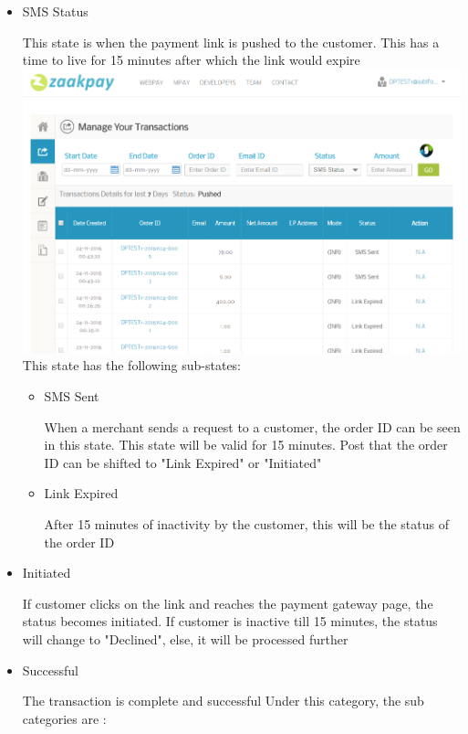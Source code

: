 \documentclass{article}
\begin{document}
\begin{itemize}

\item SMS Status

This state is when the payment link is pushed to the customer. This has a time to live for 15 minutes after which the link would expire \\
\includegraphics[width=6.5 in,height=3.4 in]{sms_sent.png} \\
This state has the following sub-states:
\begin{itemize}
\item SMS Sent

When a merchant sends a request to a customer, the order ID can be seen in this state. This state will be valid for 15 minutes. Post that the order ID can be shifted to "Link Expired" or "Initiated"
\item Link Expired

After 15 minutes of inactivity by the customer, this will be the status of the order ID 



\end{itemize}
\newpage
\item Initiated

If customer clicks on the link and reaches the payment gateway page, the status becomes initiated. If customer is inactive till 15 minutes, the status will change to "Declined", else, it will be processed further
\item Successful

The transaction is complete and successful
Under this category, the sub categories are :
\begin{itemize}


\end{itemize}
\end{itemize}
\end{document}
